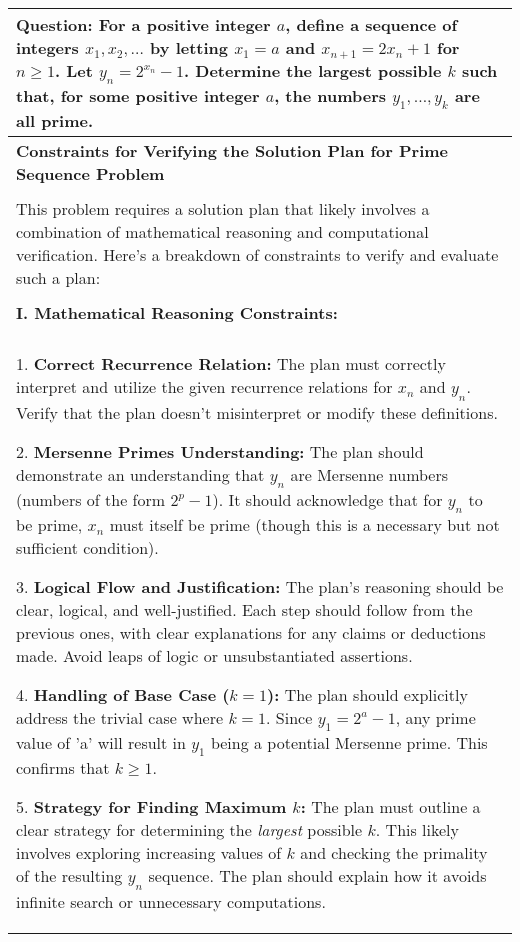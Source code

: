 \begin{table*}
\centering
\footnotesize
\begin{tabular}{p{\linewidth}}
\toprule
\textbf{Question:} For a positive integer $a$, define a sequence of integers $x_{1}, x_{2}, \ldots$ by letting $x_{1}=a$ and $x_{n+1}=2 x_{n}+1$ for $n\geq1$. Let $y_{n}=2^{x_{n}}-1$. Determine the largest possible $k$ such that, for some positive integer $a$, the numbers $y_{1}, \ldots, y_{k}$ are all prime. \\ \midrule

\textbf{Constraints for Verifying the Solution Plan for Prime Sequence Problem}
\\\\
This problem requires a solution plan that likely involves a combination of mathematical reasoning and computational verification. Here's a breakdown of constraints to verify and evaluate such a plan:
\\\\
\textbf{I. Mathematical Reasoning Constraints:}
\\\\
1. \textbf{Correct Recurrence Relation:} The plan must correctly interpret and utilize the given recurrence relations for $x_n$ and $y_n$. Verify that the plan doesn't misinterpret or modify these definitions.

2. \textbf{Mersenne Primes Understanding:} The plan should demonstrate an understanding that $y_n$ are Mersenne numbers (numbers of the form $2^p - 1$). It should acknowledge that for $y_n$ to be prime, $x_n$ must itself be prime (though this is a necessary but not sufficient condition).

3. \textbf{Logical Flow and Justification:} The plan's reasoning should be clear, logical, and well-justified. Each step should follow from the previous ones, with clear explanations for any claims or deductions made. Avoid leaps of logic or unsubstantiated assertions.

4. \textbf{Handling of Base Case ($k=1$):} The plan should explicitly address the trivial case where $k=1$. Since $y_1 = 2^a - 1$, any prime value of 'a' will result in $y_1$ being a potential Mersenne prime. This confirms that $k \ge 1$.

5. \textbf{Strategy for Finding Maximum $k$:} The plan must outline a clear strategy for determining the \textit{largest} possible $k$. This likely involves exploring increasing values of $k$ and checking the primality of the resulting $y_n$ sequence. The plan should explain how it avoids infinite search or unnecessary computations.


\end{tabular}
\end{table*}
